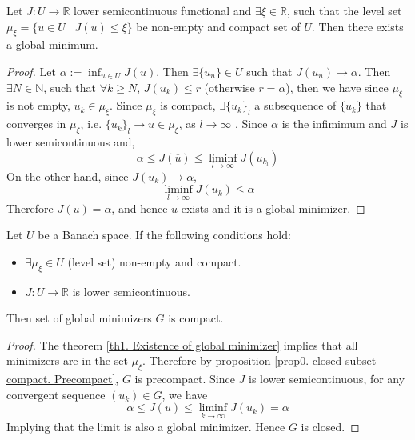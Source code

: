 \begin{theorem}
	Let $J: U\rightarrow \mathbb{R}$ lower semicontinuous functional and $\exists \xi \in \mathbb{R}$, such that the level set $\mu_\xi=\{ u \in U \mid J(u)\leq \xi\}$ be non-empty and compact set of $U$. Then there exists a global minimum.
	\begin{proof}
		Let $\alpha := \inf_{u\in U} J(u)$. Then $\exists \{u_n\} \in U $ such that $J(u_n) \rightarrow \alpha$. Then  $\exists N\in \mathbb{N}$, such that $\forall k \geq N$,  $J(u_k) \leq r$ (otherwise $r=\alpha$), then we have since $\mu_\xi$ is not empty, $u_k \in \mu_\xi$. Since $\mu_\xi$ is compact,  $\exists \{u_k\}_l$ a subsequence of $\{u_k\}$ that converges in $\mu_\xi$, i.e. $\{u_k\}_l \rightarrow \overline{u} \in \mu_\xi$, as $l \rightarrow \infty$	. Since $\alpha$ is the infimimum and $J$ is lower semicontinuous and,
		 \[\alpha \leq J(\overline{u}) \leq \liminf_{l\rightarrow \infty} J(u_{k_l}) \]
		 On the other hand,  since $J(u_k) \rightarrow \alpha$,
		 \[
		  \liminf_{l\rightarrow \infty} J(u_k) \leq \alpha
		 \]
		 Therefore $J(\overline{u})=\alpha$, and hence $\overline{u}$ exists and it is a global minimizer.
	\end{proof}
	\label{th1. Existence of global minimizer}
\end{theorem}
\begin{corollary}
	Let $U$ be a Banach space. If the following conditions hold:
	\begin{itemize}
		\item $\exists \mu_\xi \in U$ (level set) non-empty and compact.
		\item $J: U \rightarrow \overline{\mathbb{R}}$ is lower semicontinuous. 
	\end{itemize}
	Then set of global minimizers  $G$ is compact.
	\begin{proof}
		The theorem \ref{th1. Existence of global minimizer} implies that all minimizers are in the set $\mu_\xi$. Therefore by proposition \ref{prop0. closed subset compact. Precompact}, $G$ is precompact. Since $J$ is lower semicontinuous, for any convergent sequence $(u_k) \in G$, we have
		\[
			\alpha \leq J(u) \leq \liminf_{k\rightarrow\infty} J(u_k)=\alpha
		\]
		Implying that the limit is also a global minimizer. Hence $G$ is closed.
	\end{proof}
\end{corollary}
